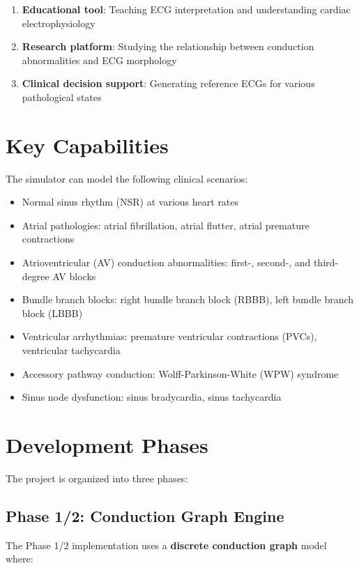 \documentclass[12pt,a4paper,oneside]{book}
\begin{document}
\begin{enumerate}
    \item \textbf{Educational tool}: Teaching ECG interpretation and understanding cardiac electrophysiology
    \item \textbf{Research platform}: Studying the relationship between conduction abnormalities and ECG morphology
    \item \textbf{Clinical decision support}: Generating reference ECGs for various pathological states
\end{enumerate}

\section{Key Capabilities}

The simulator can model the following clinical scenarios:

\begin{itemize}
    \item Normal sinus rhythm (NSR) at various heart rates
    \item Atrial pathologies: atrial fibrillation, atrial flutter, atrial premature contractions
    \item Atrioventricular (AV) conduction abnormalities: first-, second-, and third-degree AV blocks
    \item Bundle branch blocks: right bundle branch block (RBBB), left bundle branch block (LBBB)
    \item Ventricular arrhythmias: premature ventricular contractions (PVCs), ventricular tachycardia
    \item Accessory pathway conduction: Wolff-Parkinson-White (WPW) syndrome
    \item Sinus node dysfunction: sinus bradycardia, sinus tachycardia
\end{itemize}

\section{Development Phases}

The project is organized into three phases:

\subsection{Phase 1/2: Conduction Graph Engine}

The Phase 1/2 implementation uses a \textbf{discrete conduction graph} model where:
\end{document}
